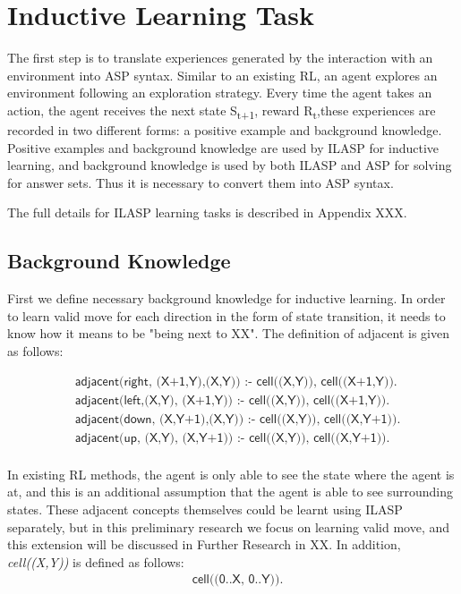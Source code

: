 \section{Inductive Learning Task}
\label{sec:inductive_learning_task}

The first step is to translate experiences generated by the interaction with an environment into ASP syntax. 
Similar to an existing RL, an agent explores an environment following an exploration strategy.
Every time the agent takes an action, the agent receives the next state S\textsubscript{t+1}, reward R\textsubscript{t},these experiences are recorded in two different forms: 
a positive example and background knowledge.
Positive examples and background knowledge are used by ILASP for inductive learning, and background knowledge is used by both ILASP and ASP for solving for answer sets.
Thus it is necessary to convert them into ASP syntax.

The full details for ILASP learning tasks is described in Appendix XXX.

\subsection{Background Knowledge}
First we define necessary background knowledge for inductive learning.
In order to learn valid move for each direction in the form of state transition, it needs to know how it means to be "being next to XX".
The definition of \textsf{adjacent} is given as follows:

\begin{equation} \label{eq:adjacent}
\begin{split}
&\textsf{adjacent(right, (X+1,Y),(X,Y)) :- cell((X,Y)), cell((X+1,Y)).} \\
&\textsf{adjacent(left,(X,Y),  (X+1,Y)) :- cell((X,Y)), cell((X+1,Y)).} \\
&\textsf{adjacent(down, (X,Y+1),(X,Y)) :- cell((X,Y)), cell((X,Y+1)).} \\
&\textsf{adjacent(up,   (X,Y),  (X,Y+1)) :- cell((X,Y)), cell((X,Y+1)).} \\
\end{split}
\end{equation}

In existing RL methods, the agent is only able to see the state where the agent is at, and this is an additional assumption that the agent is able to see surrounding states.
These adjacent concepts themselves could be learnt using ILASP separately, but in this preliminary research we focus on learning valid move, and this extension will be discussed in Further Research in XX.
In addition, \textit{cell((X,Y))} is defined as follows:
\begin{equation} \label{eq:cell}
\begin{split}
    &\textsf{cell((0..X, 0..Y)).}
\end{split}
\end{equation}

